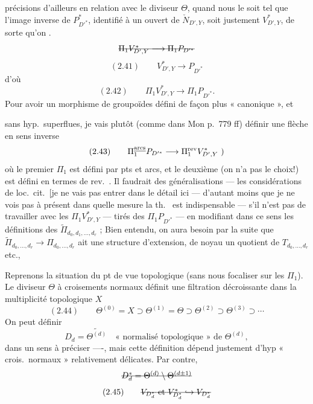 \documentclass[11pt,a4paper]{article}
\begin{document}
\ill{}  précisions d'ailleurs en relation avec le diviseur $\Theta$, quand nous  le \struck{\ill{}}  soit tel que l'image inverse de $P^*_{D'^*}$, identifié  à un ouvert de $\check N_{D',Y}$, soit justement $V^*_{D',Y}$, de sorte qu'on   \ill{}.
\[
\text{\struck{$\Pi_1 V^*_{D',Y}\longrightarrow \Pi_1 P_{D'^*}$}}
\]
\[
(2.41)\qquad V^*_{D',Y}\longrightarrow P_{D'^*}
\]
d'où
\[
(2.42)\qquad \Pi_1 V^*_{D',Y}\longrightarrow \Pi_1 P_{D'^*} .
\]
Pour avoir un morphisme de groupoïdes défini de façon plus « canonique », et

sans hyp.\ superflues, je vais plutôt (comme dans Mon p.~779 ff) définir une flèche en sens inverse
\[
(2.43)\qquad \Pi_1^{\text{\uncertain{arcs}}} P_{D'^*}\longrightarrow \Pi_1^{\text{rev}} V^*_{D',Y}\ )
\]
où le premier $\Pi_1$ est défini par pts et arcs, et le deuxième (on n'a pas le choix!) est défini en termes de rev.~. Il faudrait des généralisations —  \ill{} les considérations de loc.\ cit.\ [je ne vais pas entrer dans le détail ici — d'autant moins que je ne vois pas  à présent dans quelle mesure la th.\  est indispensable — s'il n'est pas   \struck{\ill{}} de travailler avec les $\Pi_1 V^*_{D',Y}$ — tirés des $\Pi_1 P_{D'^*}$ — en modifiant dans ce sens les définitions des $\widetilde\Pi_{d_0,d_1,\dots,d_r}$ ; Bien entendu, on aura besoin par la suite que $\widetilde\Pi_{d_0,\dots,d_r}\to\Pi_{d_0,\dots,d_r}$ ait une structure d'extension, de noyau un quotient de $T_{d_0,\dots,d_r}$ etc.,

  

Reprenons la situation du pt de vue topologique (sans nous focaliser sur les $\Pi_1$). Le diviseur $\Theta$ à croisements normaux  définit une filtration décroissante dans la multiplicité topologique $X$
\[
(2.44)\qquad \Theta^{(0)}=X\supset\Theta^{(1)}=\Theta\supset\Theta^{(2)}\supset\Theta^{(3)}\supset\cdots
\]
On peut définir
\[
D_d=\widetilde{\Theta^{(d)}}\quad\text{« normalisé topologique » de }\Theta^{(d)},
\]
dans un sens à préciser ----, \struck{\ill{}} mais cette définition dépend justement d'hyp « crois.\ normaux »  relativement délicates. Par contre, \struck{\ill{}}
\[
\text{\struck{$D^*_d=\Theta^{(d)}\setminus\Theta^{(d\pm1)}$}}
\]
\[
(2.45)\qquad \text{\struck{$V_{D^*_d}$ et $V^*_{D^*_d}\hookrightarrow V_{D^*_d}$}}
\]
\end{document}
